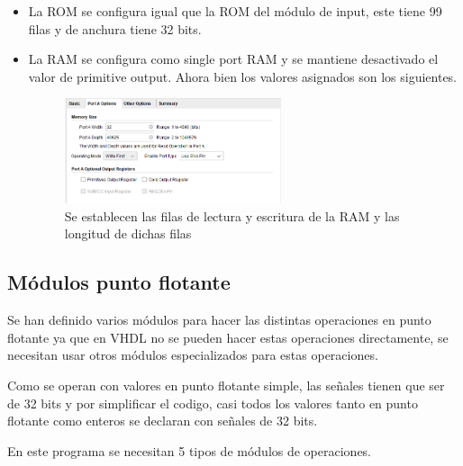 \begin{itemize}
\item La ROM se configura igual que la ROM del módulo de input, este tiene 99 filas y de anchura 
tiene 32 bits.
\item La RAM se configura como single port RAM y se mantiene desactivado el valor de primitive output.
 Ahora bien los valores asignados son los siguientes.
 
\begin{figure}[h!]
    \centering
    \includegraphics[width=0.6\textwidth]{./Images/img_implementacion_hw/rom_muestras_2.png}
    \caption{Se establecen las filas de lectura y escritura de la RAM y las longitud de dichas filas}
    \label{fig:ram_muestras_1}
\end{figure}

\end{itemize}

\subsection{Módulos punto flotante}

Se han definido varios módulos para hacer las distintas operaciones en punto flotante ya que en VHDL no se
pueden hacer estas operaciones directamente, se necesitan usar otros módulos especializados para estas operaciones.

Como se operan con valores en punto flotante simple, las señales tienen que ser de 32 bits y por simplificar el
codigo, casi todos los valores tanto en punto flotante como enteros se declaran con señales de 32 bits.

En este programa se necesitan 5 tipos de módulos de operaciones.

